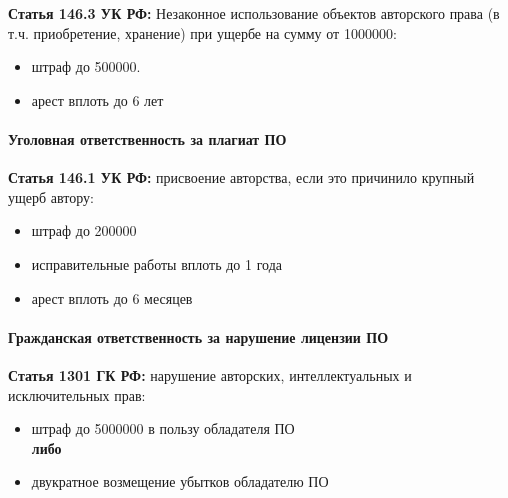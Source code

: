 \textbf{Статья 146.3 УК РФ:} Незаконное использование объектов авторского права (в т.ч. приобретение, хранение) при ущербе на сумму от \qty{1000000}{\rub}:
\begin{itemize}
    \item штраф до \qty{500000}{\rub}.
    \item арест вплоть до 6 лет
\end{itemize}

\paragraph*{Уголовная ответственность за плагиат ПО}
\textbf{Статья 146.1 УК РФ:} присвоение авторства, если это причинило крупный ущерб автору:
\begin{itemize}
    \item штраф до \qty{200000}{\rub}
    \item исправительные работы вплоть до 1 года
    \item арест вплоть до 6 месяцев
\end{itemize}

\paragraph*{Гражданская ответственность за нарушение лицензии ПО}
\textbf{Статья 1301 ГК РФ:} нарушение авторских, интеллектуальных и исключительных прав:
\begin{itemize}
    \item штраф до \qty{5000000}{\rub} в пользу обладателя ПО \\ \textbf{либо}
    \item двукратное возмещение убытков обладателю ПО
\end{itemize}
